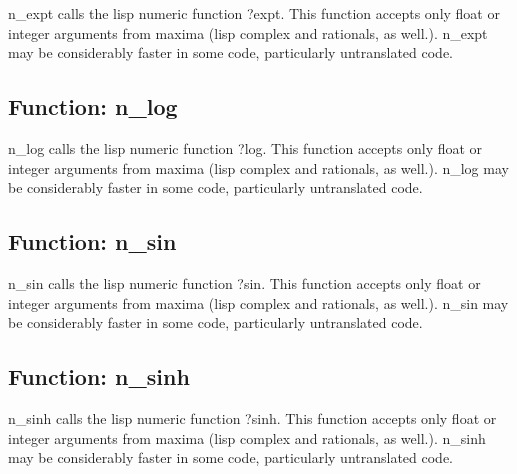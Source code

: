 \documentclass[]{article}
\begin{document}
\vspace{5 pt}
n\_expt calls the lisp numeric function ?expt. This function accepts only float or integer arguments from maxima (lisp complex and rationals, as well.). n\_expt may be considerably faster in some code, particularly untranslated code. 

\vspace{5 pt}


\subsection{Function: n\_log\label{sec:n_log}}
\hypertarget{n_log}{}



\vspace{5 pt}
n\_log calls the lisp numeric function ?log. This function accepts only float or integer arguments from maxima (lisp complex and rationals, as well.). n\_log may be considerably faster in some code, particularly untranslated code. 

\vspace{5 pt}


\subsection{Function: n\_sin\label{sec:n_sin}}
\hypertarget{n_sin}{}



\vspace{5 pt}
n\_sin calls the lisp numeric function ?sin. This function accepts only float or integer arguments from maxima (lisp complex and rationals, as well.). n\_sin may be considerably faster in some code, particularly untranslated code. 

\vspace{5 pt}


\subsection{Function: n\_sinh\label{sec:n_sinh}}
\hypertarget{n_sinh}{}



\vspace{5 pt}
n\_sinh calls the lisp numeric function ?sinh. This function accepts only float or integer arguments from maxima (lisp complex and rationals, as well.). n\_sinh may be considerably faster in some code, particularly untranslated code. 
\end{document}
